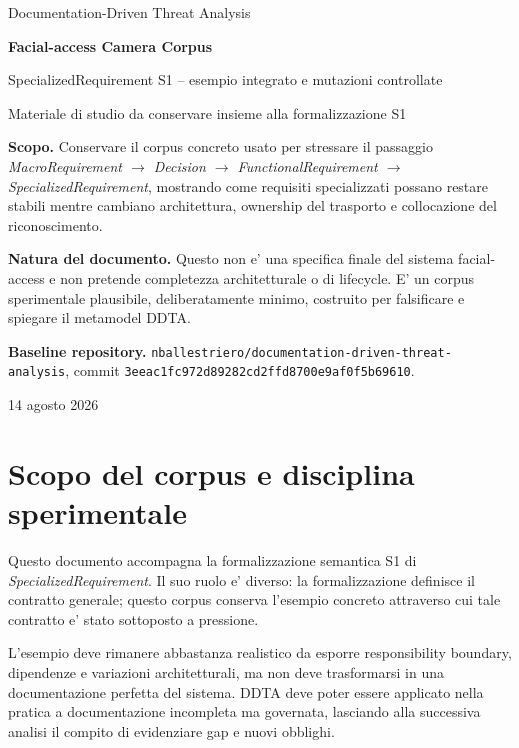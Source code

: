 \documentclass[11pt,a4paper]{article}
\begin{document}
\begin{titlepage}
\centering
\vspace*{1.8cm}
{\Large Documentation-Driven Threat Analysis\par}
\vspace{0.8cm}
{\Huge\bfseries Facial-access Camera Corpus\par}
\vspace{0.30cm}
{\LARGE SpecializedRequirement S1 -- esempio integrato e mutazioni controllate\par}
\vspace{0.9cm}
{\large Materiale di studio da conservare insieme alla formalizzazione S1\par}
\vfill
\begin{minipage}{0.84\textwidth}
\small
\textbf{Scopo.} Conservare il corpus concreto usato per stressare il passaggio \emph{MacroRequirement $\rightarrow$ Decision $\rightarrow$ FunctionalRequirement $\rightarrow$ SpecializedRequirement}, mostrando come requisiti specializzati possano restare stabili mentre cambiano architettura, ownership del trasporto e collocazione del riconoscimento.

\medskip
\textbf{Natura del documento.} Questo non e' una specifica finale del sistema facial-access e non pretende completezza architetturale o di lifecycle. E' un corpus sperimentale plausibile, deliberatamente minimo, costruito per falsificare e spiegare il metamodel DDTA.

\medskip
\textbf{Baseline repository.} \texttt{nballestriero/documentation-driven-threat-analysis}, commit \texttt{3eeac1fc972d89282cd2ffd8700e9af0f5b69610}.
\end{minipage}
\vfill
{\large 14 agosto 2026\par}
\end{titlepage}

\tableofcontents
\newpage

\section{Scopo del corpus e disciplina sperimentale}

Questo documento accompagna la formalizzazione semantica S1 di \emph{SpecializedRequirement}. Il suo ruolo e' diverso: la formalizzazione definisce il contratto generale; questo corpus conserva l'esempio concreto attraverso cui tale contratto e' stato sottoposto a pressione.

L'esempio deve rimanere abbastanza realistico da esporre responsibility boundary, dipendenze e variazioni architetturali, ma non deve trasformarsi in una documentazione perfetta del sistema. DDTA deve poter essere applicato nella pratica a documentazione incompleta ma governata, lasciando alla successiva analisi il compito di evidenziare gap e nuovi obblighi.
\end{document}
